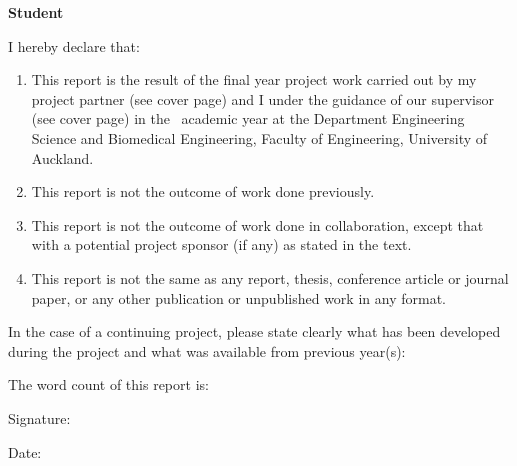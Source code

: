 \documentclass[12pt]{article}
\begin{document}
\pagestyle{empty}


\textbf{Student}

I hereby declare that:
\begin{enumerate}
    \item This report is the result of the final year project work carried out  by  my  project partner (see cover page) and I under the guidance of our supervisor (see cover page) in the \the\year~academic year at the Department Engineering Science and Biomedical Engineering, Faculty of Engineering, University of Auckland.
    \item This report is not the outcome of work done previously.
    \item This report is not the outcome of work done in collaboration, except that with a potential project sponsor (if any) as stated in the text.
    \item This report is not the same as any report, thesis, conference article or journal paper,  or any other publication or unpublished work in any format.
\end{enumerate}

In the case of a continuing project, please state clearly what has been developed during the project and what was available from previous year(s): 
\vspace{5cm} 


The word count of this report is:
\vspace{2cm}


Signature:

\vspace{.5cm}

Date:
\end{document}
